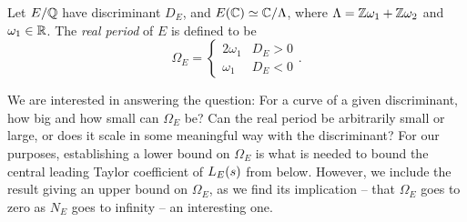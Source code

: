 \begin{definition}\label{defn:real_period}
Let $E/\mathbb{Q}$ have discriminant $D_E$, and $E(\mathbb{C}) \simeq \mathbb{C}/\Lambda$, where $\Lambda = \mathbb{Z}\omega_1 + \mathbb{Z}\omega_2$ and $\omega_1 \in \mathbb{R}$. The {\it real period} of $E$ is defined to be
\begin{equation}
\Omega_E = \begin{cases} 2\omega_1 & D_E > 0 \\ \omega_1 & D_E < 0 \end{cases}.
\end{equation}
\end{definition}

We are interested in answering the question: For a curve of a given discriminant, how big and how small can $\Omega_E$ be? Can the real period be arbitrarily small or large, or does it scale in some meaningful way with the discriminant? For our purposes, establishing a lower bound on $\Omega_E$ is what is needed to bound the central leading Taylor coefficient of $L_E(s)$ from below. However, we include the result giving an upper bound on $\Omega_E$, as we find its implication -- that $\Omega_E$ goes to zero as $N_E$ goes to infinity -- an interesting one. \\

